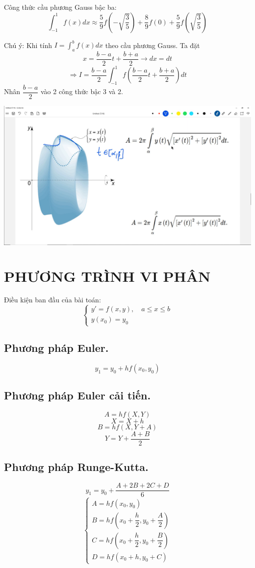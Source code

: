 \documentclass[12pt, a4paper]{report}
\begin{document}
Công thức cầu phương Gauss bậc ba:
\[
    \int_{-1}^{1} f(x) dx \approx \frac{5}{9} f \left( -\sqrt{\frac{3}{5}} \right) + \frac{8}{9}f(0) + \frac{5}{9} f \left( \sqrt{\frac{3}{5}} \right)  
\]

Chú ý: Khi tính $I = \displaystyle \int_{a}^{b} f(x)dx$ theo cầu phương Gauss. Ta đặt
\[
    x = \frac{b-a}{2}t  + \frac{b+a}{2} \rightarrow dx = dt    
\]
\[
    \Rightarrow I = \frac{b-a}{2} \displaystyle \int_{-1}^{1} f \left( \frac{b-a}{2}t  + \frac{b+a}{2} \right) dt 
\]
Nhân $\dfrac{b-a}{2}$ vào 2 công thức bậc 3 và 2.

\begin{center}
    \includegraphics*[scale = 0.28]{8.png}
\end{center}
\newpage
\chapter{PHƯƠNG TRÌNH VI PHÂN}
Điều kiện ban đầu của bài toán:
\[
    \begin{cases}
        y' = f(x,y), \quad a \leqslant x \leqslant b \\
        y(x_0) = y_0
    \end{cases}    
\]
\section{Phương pháp Euler.}
\[
    y_1 = y_0 + hf(x_0,y_0)  
\]
\section{Phương pháp Euler cải tiến.}
\[
    A = hf(X,Y)    
\]
\[
    X = X + h    
\]
\[
    B = hf(X,Y+A)    
\]
\[
    Y = Y + \frac{A+B}{2}    
\]
\section{Phương pháp Runge-Kutta.}
\[
    y_1 = y_0 + \frac{A + 2B + 2C + D}{6}    
\]
\[
    \begin{cases}
        A = hf(x_0,y_0) \\
        B = hf(x_0 + \dfrac{h}{2}, y_0 + \dfrac{A}{2}) \\
        C = hf(x_0 + \dfrac{h}{2}, y_0 + \dfrac{B}{2}) \\
        D = hf(x_0 + h, y_0 + C)
    \end{cases}    
\]
\end{document}
